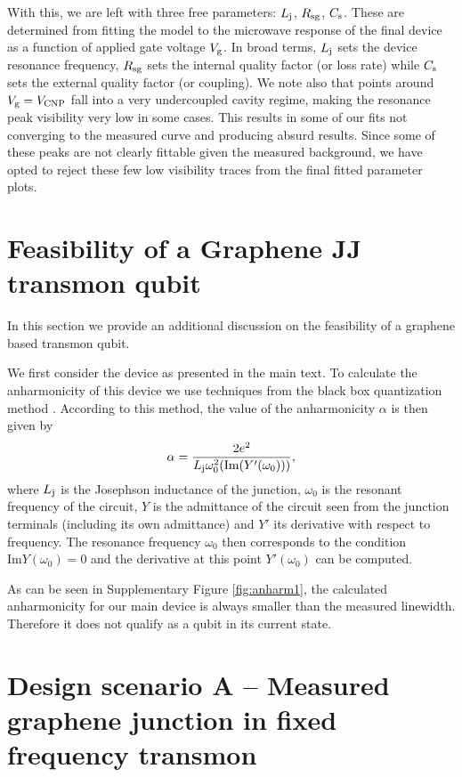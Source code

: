 \documentclass[preprint,
  onecolumn,
  notitlepage,
  amsmath,amssymb,
  aip,
  apl,
]{revtex4-1}
\begin{document}
With this, we are left with three free parameters: $L_{\rm j}$, $R_{\rm sg}$, $C_{\rm s}$.
These are determined from fitting the model to the microwave response of the final device as a function of applied gate voltage $V_{\rm g}$.
In broad terms, $L_{\rm j}$ sets the device resonance frequency, $R_{\rm sg}$ sets the internal quality factor (or loss rate) while $C_{\rm s}$ sets the external quality factor (or coupling).
We note also that points around $V_{\rm g} = V_{\rm CNP}$ fall into a very undercoupled cavity regime, making the resonance peak visibility very low in some cases.
This results in some of our fits not converging to the measured curve and producing absurd results.
Since some of these peaks are not clearly fittable given the measured background, we have opted to reject these few low visibility traces from the final fitted parameter plots.

\section{Feasibility of a Graphene JJ transmon qubit}\label{sec:feasability}
\noindent In this section we provide an additional discussion on the feasibility of a graphene based transmon qubit.

We first consider the device as presented in the main text.
To calculate the anharmonicity of this device we use techniques from the black box quantization method \cite{nigg_blackbox_2012}.
According to this method, the value of the anharmonicity $\alpha$ is then given by
\begin{equation}
\alpha = \frac{2e^2}{L_{\rm j}\omega_0^2(\textrm{Im}(Y'(\omega_0)))},
\end{equation}
where $L_{\rm j}$ is the Josephson inductance of the junction, $\omega_0$ is the resonant frequency of the circuit, $Y$ is the admittance of the circuit seen from the junction terminals (including its own admittance) and $Y'$ its derivative with respect to frequency.
The resonance frequency $\omega_0$ then corresponds to the condition $\textrm{Im}Y(\omega_0) = 0$ and the derivative at this point $Y'(\omega_0)$ can be computed.

As can be seen in Supplementary Figure \ref{fig:anharm1}, the calculated anharmonicity for our main device is always smaller than the measured linewidth.
Therefore it does not qualify as a qubit in its current state.



\section{Design scenario A -- Measured graphene junction in fixed frequency transmon}\label{sec:scenA}
\end{document}
